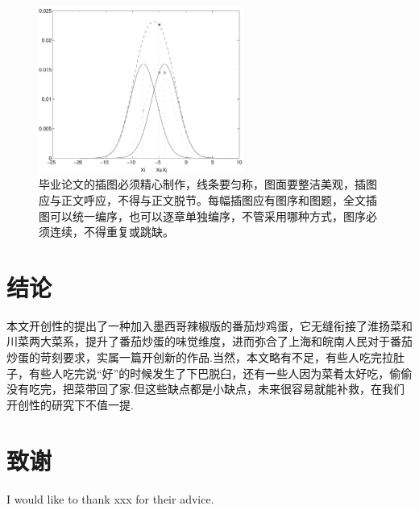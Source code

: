 \begin{figure}[htb]
    \centering
    \includegraphics[width=0.6\textwidth]{figures/example.pdf}
    \caption{毕业论文的插图必须精心制作，线条要匀称，图面要整洁美观，插图应与正文呼应，不得与正文脱节。每幅插图应有图序和图题，全文插图可以统一编序，也可以逐章单独编序，不管采用哪种方式，图序必须连续，不得重复或跳缺。}
    \label{fig:1}
\end{figure}




\clearpage
\section{结论}
本文开创性的提出了一种加入墨西哥辣椒版的番茄炒鸡蛋，它无缝衔接了淮扬菜和川菜两大菜系，提升了番茄炒蛋的味觉维度，进而弥合了上海和皖南人民对于番茄炒蛋的苛刻要求，实属一篇开创新的作品.当然，本文略有不足，有些人吃完拉肚子，有些人吃完说“好”的时候发生了下巴脱臼，还有一些人因为菜肴太好吃，偷偷没有吃完，把菜带回了家.但这些缺点都是小缺点，未来很容易就能补救，在我们开创性的研究下不值一提.



\clearpage




\clearpage
\section*{致谢}
I would like to thank xxx for their advice.






